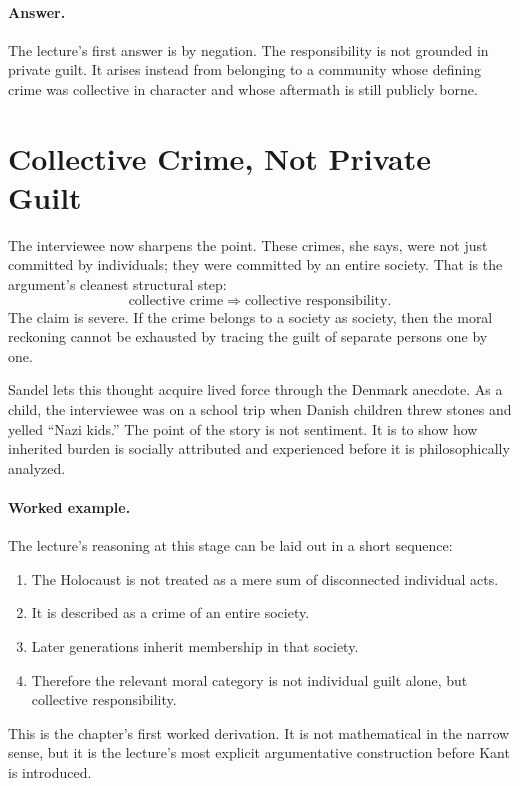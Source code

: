 \paragraph{Answer.} The lecture's first answer is by negation. The responsibility is not grounded in private guilt. It arises instead from belonging to a community whose defining crime was collective in character and whose aftermath is still publicly borne.

\section{Collective Crime, Not Private Guilt}

The interviewee now sharpens the point. These crimes, she says, were not just committed by individuals; they were committed by an entire society. That is the argument's cleanest structural step:
\begin{equation}
\text{collective crime}
\Longrightarrow
\text{collective responsibility}.
\end{equation}
The claim is severe. If the crime belongs to a society as society, then the moral reckoning cannot be exhausted by tracing the guilt of separate persons one by one.

Sandel lets this thought acquire lived force through the Denmark anecdote. As a child, the interviewee was on a school trip when Danish children threw stones and yelled ``Nazi kids.'' The point of the story is not sentiment. It is to show how inherited burden is socially attributed and experienced before it is philosophically analyzed.

\paragraph{Worked example.} The lecture's reasoning at this stage can be laid out in a short sequence:
\begin{enumerate}
\item The Holocaust is not treated as a mere sum of disconnected individual acts.
\item It is described as a crime of an entire society.
\item Later generations inherit membership in that society.
\item Therefore the relevant moral category is not individual guilt alone, but collective responsibility.
\end{enumerate}
This is the chapter's first worked derivation. It is not mathematical in the narrow sense, but it is the lecture's most explicit argumentative construction before Kant is introduced.

